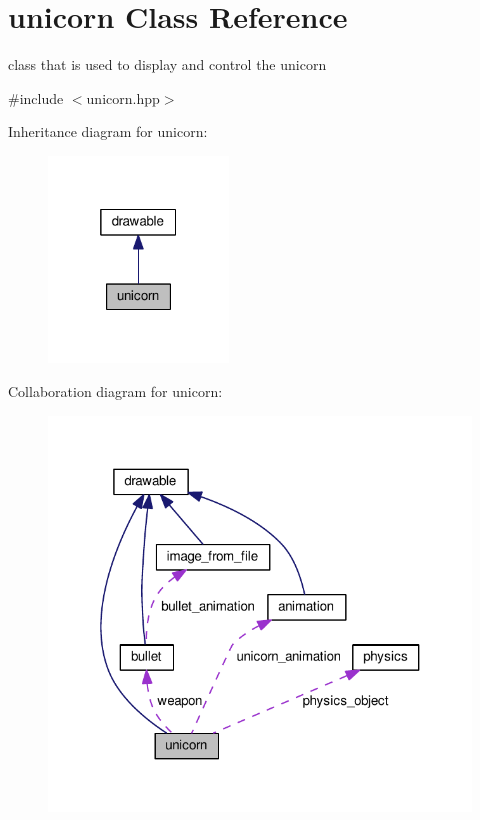 \hypertarget{classunicorn}{}\section{unicorn Class Reference}
\label{classunicorn}


class that is used to display and control the unicorn  




{\ttfamily \#include $<$unicorn.\+hpp$>$}



Inheritance diagram for unicorn\+:\nopagebreak
\begin{figure}[H]
\begin{center}
\leavevmode
\includegraphics[width=136pt]{classunicorn__inherit__graph}
\end{center}
\end{figure}


Collaboration diagram for unicorn\+:\nopagebreak
\begin{figure}[H]
\begin{center}
\leavevmode
\includegraphics[width=321pt]{classunicorn__coll__graph}
\end{center}
\end{figure}
